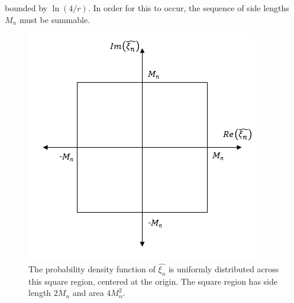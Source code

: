 bounded by $\ln(4/r)$. In order for this to occur, the sequence of side lengths $M_n$ must be summable. 
\begin{figure}[!h]
\caption[Uniform Distribution over a Square Region]{The probability
  density function of $\hat{\xi_n}$ is uniformly distributed across
  this square region, centered at the origin. The square region has
  side length $2M_n$ and area $4M_n^2$.}\label{fig:square}
	\begin{center}
		\includegraphics[scale=0.7]{figs/square.png}
	\end{center}
\end{figure}

